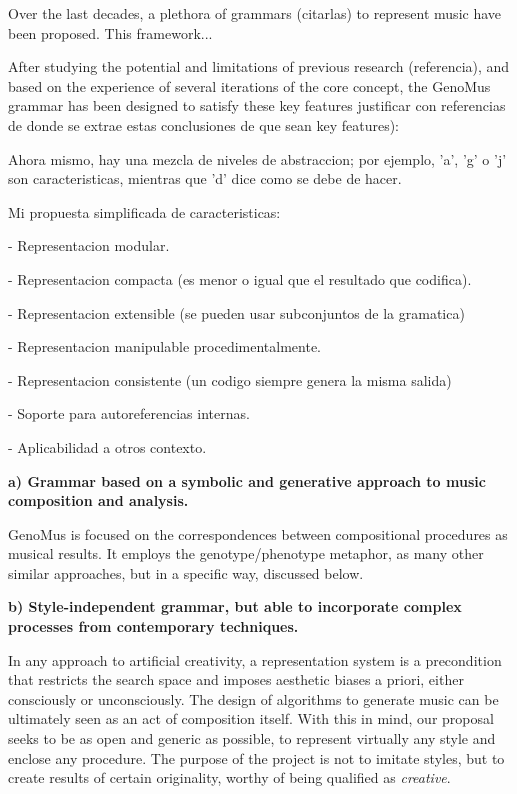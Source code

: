 \documentclass{article}
\begin{document}
Over the last decades, a plethora of grammars {\color{red}(citarlas)} to represent music have been proposed. This framework...  

After studying the potential and limitations of previous research {\color{red}(referencia)}, and based on the experience of several iterations of the core concept, the GenoMus grammar has been designed to satisfy these key features {\color{red}justificar con referencias de donde se extrae estas conclusiones de que sean key features)}:

{\color{red}Ahora mismo, hay una mezcla de niveles de abstraccion; por ejemplo, 'a', 'g' o 'j' son caracteristicas, mientras que 'd' dice como se debe de hacer.}

{\color{red}Mi propuesta simplificada de caracteristicas:

- Representacion modular.

- Representacion compacta (es menor o igual que el resultado que codifica).

- Representacion extensible (se pueden usar subconjuntos de la gramatica)

- Representacion manipulable procedimentalmente.

- Representacion consistente (un codigo siempre genera la misma salida)

- Soporte para autoreferencias internas.

- Aplicabilidad a otros contexto.
}

\textbf{a) Grammar based on a symbolic and generative approach to music composition and analysis.}

GenoMus is focused on the correspondences between compositional procedures as musical results. It employs the genotype/phenotype metaphor, as many other similar approaches, but in a specific way, discussed below.

\textbf{b) Style-independent grammar, but able to incorporate complex processes from contemporary techniques.} 

In any approach to artificial creativity, a representation system is a precondition that restricts the search space and imposes aesthetic biases a priori, either consciously or unconsciously. The design of algorithms to generate music can be ultimately seen as an act of composition itself. With this in mind, our proposal seeks to be as open and generic as possible, to represent virtually any style and enclose any procedure. The purpose of the project is not to imitate styles, but to create results of certain originality, worthy of being qualified as \emph{creative}. 
\end{document}
